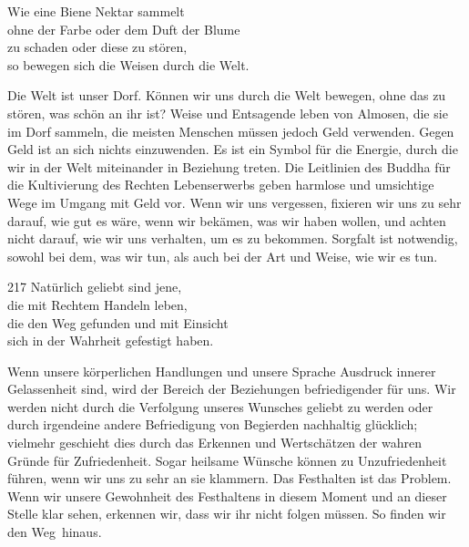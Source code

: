 
\begin{dhpVerse}{49}
\label{dhp-49}
Wie eine Biene Nektar sammelt\\ 
ohne der Farbe oder dem Duft der Blume\\ 
zu schaden oder diese zu stören,\\ 
so bewegen sich die Weisen durch die Welt. 
\end{dhpVerse}

\begin{dhpRefl}

Die Welt ist unser Dorf. Können wir uns durch die Welt bewegen, ohne das zu
stören, was schön an ihr ist? Weise und Entsagende leben von Almosen, die sie
im Dorf sammeln, die meisten Menschen müssen jedoch Geld verwenden. Gegen Geld
ist an sich nichts einzuwenden. Es ist ein Symbol für die Energie, durch die
wir in der Welt miteinander in Beziehung treten. Die Leitlinien des Buddha für
die Kultivierung des Rechten Lebenserwerbs geben harmlose und umsichtige Wege
im Umgang mit Geld vor. Wenn wir uns vergessen, fixieren wir uns zu sehr
darauf, wie gut es wäre, wenn wir bekämen, was wir haben wollen, und achten
nicht darauf, wie wir uns verhalten, um es zu bekommen. Sorgfalt ist
notwendig, sowohl bei dem, was wir tun, als auch bei der Art und Weise, wie
wir es tun.

\end{dhpRefl}


\begin{dhpVerse}{217}
\label{dhp-217}
Natürlich geliebt sind jene,\\ 
die mit Rechtem Handeln leben,\\ 
die den Weg gefunden und mit Einsicht\\ 
sich in der Wahrheit gefestigt haben. 
\end{dhpVerse}

\begin{dhpRefl}

Wenn unsere körperlichen Handlungen und unsere Sprache Ausdruck innerer
Gelassenheit sind, wird der Bereich der Beziehungen befriedigender für uns.
Wir werden nicht durch die Verfolgung unseres Wunsches geliebt zu werden oder
durch irgendeine andere Befriedigung von Begierden nachhaltig glücklich;
vielmehr geschieht dies durch das Erkennen und Wertschätzen der wahren Gründe
für Zufriedenheit. Sogar heilsame Wünsche können zu Unzufriedenheit führen,
wenn wir uns zu sehr an sie klammern. Das Festhalten ist das Problem. Wenn wir
unsere Gewohnheit des Festhaltens in diesem Moment und an dieser Stelle klar
sehen, erkennen wir, dass wir ihr nicht folgen müssen. So finden wir den
Weg~hinaus.

\end{dhpRefl}

